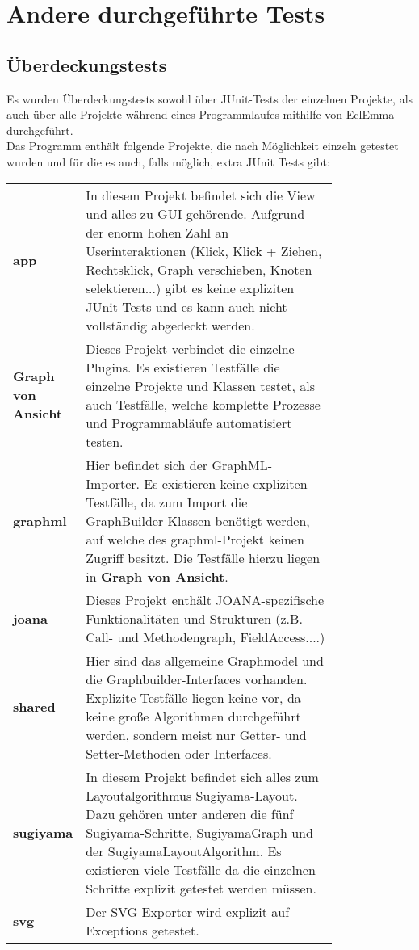 \section{Andere durchgeführte Tests}
\subsection{Überdeckungstests}
Es wurden Überdeckungstests sowohl über JUnit-Tests der einzelnen Projekte, als auch über alle Projekte während eines Programmlaufes mithilfe von EclEmma durchgeführt.\\
Das Programm enthält folgende Projekte, die nach Möglichkeit einzeln getestet wurden und für die es auch, falls möglich, extra JUnit Tests gibt:\\

\begin{longtable}{l p{0.8\linewidth}}
	\textbf{app} & In diesem Projekt befindet sich die View und alles zu GUI gehörende. Aufgrund der enorm hohen Zahl an Userinteraktionen (Klick, Klick + Ziehen, Rechtsklick, Graph verschieben, Knoten selektieren...) gibt es keine expliziten JUnit Tests und es kann auch nicht vollständig abgedeckt werden. \\

	\textbf{Graph von Ansicht} & Dieses Projekt verbindet die einzelne Plugins. Es existieren Testfälle die einzelne Projekte und Klassen testet, als auch Testfälle, welche komplette Prozesse und Programmabläufe automatisiert testen. \\
	
	\textbf{graphml} & Hier befindet sich der GraphML-Importer. Es existieren keine expliziten Testfälle, da zum Import die GraphBuilder Klassen benötigt werden, auf welche des graphml-Projekt keinen Zugriff besitzt. Die Testfälle hierzu liegen in \textbf{Graph von Ansicht}.\\
	
	\textbf{joana} & Dieses Projekt enthält JOANA-spezifische Funktionalitäten und Strukturen (z.B. Call- und Methodengraph, FieldAccess....)\\
	
	\textbf{shared} & Hier sind das allgemeine Graphmodel und die Graphbuilder-Interfaces vorhanden. Explizite Testfälle liegen keine vor, da keine große Algorithmen durchgeführt werden, sondern meist nur Getter- und Setter-Methoden oder Interfaces.\\
	
	\textbf{sugiyama} & In diesem Projekt befindet sich alles zum Layoutalgorithmus Sugiyama-Layout. Dazu gehören unter anderen die fünf Sugiyama-Schritte, SugiyamaGraph und der SugiyamaLayoutAlgorithm. Es existieren viele Testfälle da die einzelnen Schritte explizit getestet werden müssen. \\
	
	\textbf{svg} & Der SVG-Exporter wird explizit auf Exceptions getestet. \\

\end{longtable}


